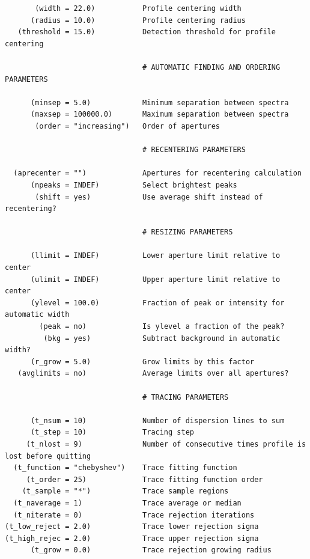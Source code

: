\documentclass[letter,11pt,oneside]{article}
\begin{document}
\begin{verbatim}
       (width = 22.0)           Profile centering width
      (radius = 10.0)           Profile centering radius
   (threshold = 15.0)           Detection threshold for profile centering
                                
                                # AUTOMATIC FINDING AND ORDERING PARAMETERS
                                
      (minsep = 5.0)            Minimum separation between spectra
      (maxsep = 100000.0)       Maximum separation between spectra
       (order = "increasing")   Order of apertures
                                
                                # RECENTERING PARAMETERS
                                
  (aprecenter = "")             Apertures for recentering calculation
      (npeaks = INDEF)          Select brightest peaks
       (shift = yes)            Use average shift instead of recentering?
                                
                                # RESIZING PARAMETERS
                                
      (llimit = INDEF)          Lower aperture limit relative to center
      (ulimit = INDEF)          Upper aperture limit relative to center
      (ylevel = 100.0)          Fraction of peak or intensity for automatic width
        (peak = no)             Is ylevel a fraction of the peak?
         (bkg = yes)            Subtract background in automatic width?
      (r_grow = 5.0)            Grow limits by this factor
   (avglimits = no)             Average limits over all apertures?
                                
                                # TRACING PARAMETERS
                                
      (t_nsum = 10)             Number of dispersion lines to sum
      (t_step = 10)             Tracing step
     (t_nlost = 9)              Number of consecutive times profile is lost before quitting
  (t_function = "chebyshev")    Trace fitting function
     (t_order = 25)             Trace fitting function order
    (t_sample = "*")            Trace sample regions
  (t_naverage = 1)              Trace average or median
  (t_niterate = 0)              Trace rejection iterations
(t_low_reject = 2.0)            Trace lower rejection sigma
(t_high_rejec = 2.0)            Trace upper rejection sigma
      (t_grow = 0.0)            Trace rejection growing radius
                                

\end{verbatim}
\end{document}
